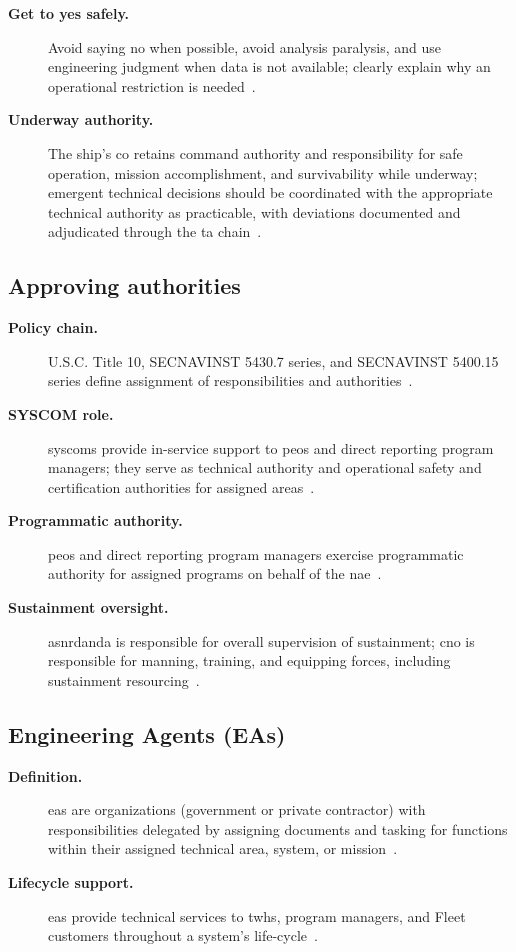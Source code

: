 \documentclass[../main.tex]{subfiles}
\begin{document}
\begin{description}
  \item[\textbf{Get to yes safely.}] Avoid saying no when possible, avoid analysis paralysis, and use engineering judgment when data is not available; clearly explain why an operational restriction is needed~\autocite{edo-2-1-5-technical-authority-2025}.
  \item[\textbf{Underway authority.}] The ship's \ac{co} retains command authority and responsibility for safe operation, mission accomplishment, and survivability while underway; emergent technical decisions should be coordinated with the appropriate technical authority as practicable, with deviations documented and adjudicated through the \ac{ta} chain~\autocite{SECNAV5400-15D,edo-2-1-5-technical-authority-2025}.
\end{description}

\subsection{Approving authorities}
\begin{description}
  \item[\textbf{Policy chain.}] U.S.C. Title 10, SECNAVINST 5430.7 series, and SECNAVINST 5400.15 series define assignment of responsibilities and authorities~\autocite{edo-2-1-5-technical-authority-2025}.
  \item[\textbf{SYSCOM role.}] \acp{syscom} provide in-service support to \acp{peo} and direct reporting program managers; they serve as technical authority and operational safety and certification authorities for assigned areas~\autocite{edo-2-1-5-technical-authority-2025}.
  \item[\textbf{Programmatic authority.}] \acp{peo} and direct reporting program managers exercise programmatic authority for assigned programs on behalf of the \ac{nae}~\autocite{edo-2-1-5-technical-authority-2025}.
  \item[\textbf{Sustainment oversight.}] \ac{asnrdanda} is responsible for overall supervision of sustainment; \ac{cno} is responsible for manning, training, and equipping forces, including sustainment resourcing~\autocite{edo-2-1-5-technical-authority-2025}.
\end{description}

\subsection{Engineering Agents (EAs)}
\begin{description}
  \item[\textbf{Definition.}] \acp{ea} are organizations (government or private contractor) with responsibilities delegated by assigning documents and tasking for functions within their assigned technical area, system, or mission~\autocite{edo-2-1-5-technical-authority-2025}.
  \item[\textbf{Lifecycle support.}] \acp{ea} provide technical services to \acp{twh}, program managers, and Fleet customers throughout a system's life-cycle~\autocite{edo-2-1-5-technical-authority-2025}.
\end{description}
\end{document}
